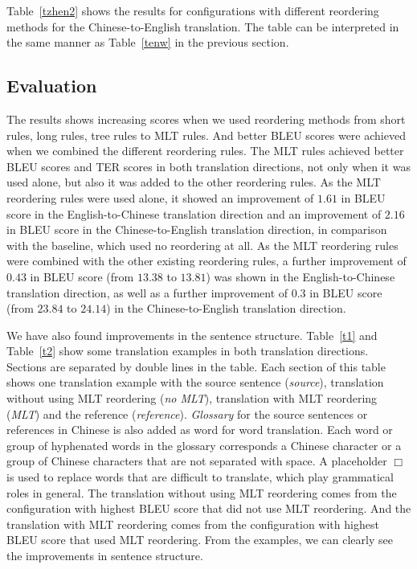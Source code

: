 \documentclass[a4paper]{article}
\begin{document}
Table~\ref{tzhen2} shows the results for configurations with different reordering methods for the Chinese-to-English translation. The table can be interpreted in the same manner as Table~\ref{tenw} in the previous section.

\subsection{Evaluation}

The results shows increasing scores when we used reordering methods from short rules, long rules, tree rules to MLT rules. And better BLEU scores were achieved when we combined the different reordering rules. The MLT rules achieved better BLEU scores and TER scores in both translation directions, not only when it was used alone, but also it was added to the other reordering rules. As the MLT reordering rules were used alone, it showed an improvement of $1.61$ in BLEU score in the English-to-Chinese translation direction and an improvement of $2.16$ in BLEU score in the Chinese-to-English translation direction, in comparison with the baseline, which used no reordering at all. As the MLT reordering rules were combined with the other existing reordering rules, a further improvement of $0.43$ in BLEU score (from $13.38$ to $13.81$) was shown in the English-to-Chinese translation direction, as well as a further improvement of $0.3$ in BLEU score (from $23.84$ to $24.14$) in the Chinese-to-English translation direction.

We have also found improvements in the sentence structure. Table~\ref{t1} and Table~\ref{t2} show some translation examples in both translation directions. Sections are separated by double lines in the table. Each section of this table shows one translation example with the source sentence (\emph{source}), translation without using MLT reordering (\emph{no MLT}), translation with MLT reordering (\emph{MLT}) and the reference (\emph{reference}). \emph{Glossary} for the source sentences or references in Chinese is also added as word for word translation. Each word or group of hyphenated words in the glossary corresponds a Chinese character or a group of Chinese characters that are not separated with space. A placeholder $\Box$ is used to replace words that are difficult to translate, which play grammatical roles in general. The translation without using MLT reordering comes from the configuration with highest BLEU score that did not use MLT reordering. And the translation with MLT reordering comes from the configuration with highest BLEU score that used MLT reordering. From the examples, we can clearly see the improvements in sentence structure.
\end{document}
